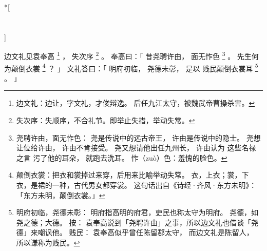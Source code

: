 
\switchcolumn[0]*[\section{}]

边文礼见袁奉高%
\footnote{%
    边文礼：边让，字文礼，才俊辩逸。
            后任九江太守，被魏武帝曹操杀害。
}%
，
失次序%
\footnote{%
    失次序：失顺序，不合礼节。即举止失措，举动失常。
}%
。
奉高曰：「
    昔尧聘许由，
    面无怍色%
    \footnote{%
        尧聘许由，面无怍色：
            尧是传说中的远古帝王，
            许由是传说中的隐士。
            尧想让位给许由，
            许由不肯接受。
            尧又想请他出任九州长，
            许由认为
            这些名禄之言
            污了他的耳朵，
            就跑去洗耳。
        怍（zuò）色：羞愧的脸色。
    }%
    。
    先生何为颠倒衣裳%
    \footnote{%
        颠倒衣裳：把衣和裳掉过来穿，后用来比喻举动失常。
                  衣，上衣；裳，下衣，是裙的一种，古代男女都穿裳。
                  这句话出自《诗经·齐风·东方未明》：
                  「东方未明，颠倒衣裳。」
    }%
    ？
」
文礼答曰：「
    明府初临，
    尧德未彰，
    是以
    贱民颠倒衣裳耳%
    \footnote{%
        明府初临，尧德未彰：
            明府指高明的府君，吏民也称太守为明府。
            尧德，如尧之德；大德。
            按：
            袁奉高说到「尧聘许由」之事，所以边文礼也借谈「尧德」来嘲讽他。
        贱民：
            袁奉高似乎曾任陈留郡太守，
            而边文礼是陈留人，
            所以谦称为贱民。
    }%
    。
」

\switchcolumn



